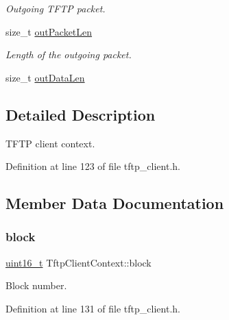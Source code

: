 \begin{DoxyCompactItemize}
\begin{DoxyCompactList}\small\item\em Outgoing T\+F\+TP packet. \end{DoxyCompactList}\item 
size\+\_\+t \hyperlink{structTftpClientContext_a007702b449446fd7e376c1a420bd518d}{out\+Packet\+Len}
\begin{DoxyCompactList}\small\item\em Length of the outgoing packet. \end{DoxyCompactList}\item 
size\+\_\+t \hyperlink{structTftpClientContext_a60ec196ee362181351a438d39116b572}{out\+Data\+Len}
\end{DoxyCompactItemize}


\subsection{Detailed Description}
T\+F\+TP client context. 

Definition at line 123 of file tftp\+\_\+client.\+h.



\subsection{Member Data Documentation}
\mbox{\label{structTftpClientContext_aa037821215c331f9c226c9c076951d3a}} 
\subsubsection{\texorpdfstring{block}{block}}
{\footnotesize\ttfamily \hyperlink{stdint_8h_a273cf69d639a59973b6019625df33e30}{uint16\+\_\+t} Tftp\+Client\+Context\+::block}



Block number. 



Definition at line 131 of file tftp\+\_\+client.\+h.

\mbox{\label{structTftpClientContext_a8d192f64cb73d6fa578e23c8171fee91}} 
